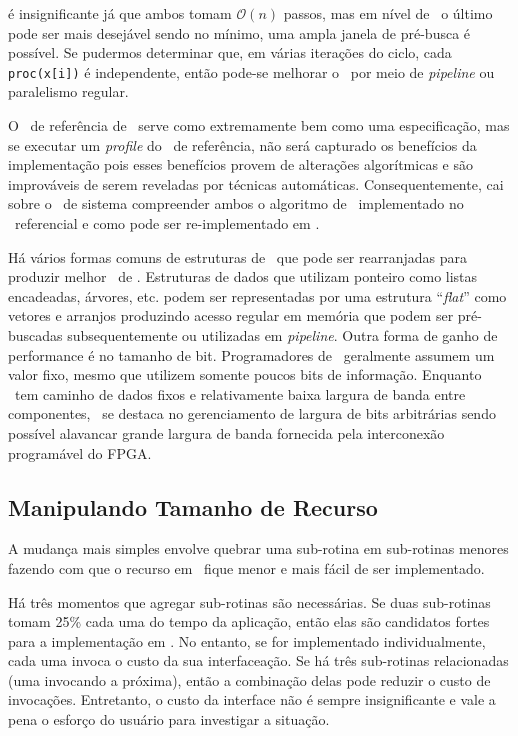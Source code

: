 		é insignificante já que ambos tomam $ \mathcal{O}(n) $ passos, mas em nível de \hardware\ o último pode ser mais desejável sendo no mínimo, uma ampla janela de pré-busca é possível. Se pudermos determinar que, em várias iterações do ciclo, cada \texttt{proc(x[i])} é independente, então pode-se melhorar o \design\ por meio de \textit{pipeline} ou paralelismo regular.

		O \design\ de referência de \software\ serve como extremamente bem como uma especificação, mas se executar um \textit{profile} do \design\ de referência, não será capturado os benefícios da implementação pois esses benefícios provem de alterações algorítmicas e são improváveis de serem reveladas por técnicas automáticas. Consequentemente, cai sobre o \designer\ de sistema compreender ambos o algoritmo de \software\ implementado no \design\ referencial e como pode ser re-implementado em \hardware.

		Há vários formas comuns de estruturas de \software\ que pode ser rearranjadas para produzir melhor \design\ de \hardware. Estruturas de dados que utilizam ponteiro como listas encadeadas, árvores, etc. podem ser representadas por uma estrutura ``\textit{flat}'' como vetores e arranjos produzindo acesso regular em memória que podem ser pré-buscadas subsequentemente ou utilizadas em \textit{pipeline}. Outra forma de ganho de performance é no tamanho de bit. Programadores de \software\ geralmente assumem um valor fixo, mesmo que utilizem somente poucos bits de informação. Enquanto \software\ tem caminho de dados fixos e relativamente baixa largura de banda entre componentes, \hardware\ se destaca no gerenciamento de largura de bits arbitrárias sendo possível alavancar grande largura de banda fornecida pela interconexão programável do FPGA.

	\subsection{Manipulando Tamanho de Recurso}

		A mudança mais simples envolve quebrar uma sub-rotina em sub-rotinas menores fazendo com que o recurso em \hardware\ fique menor e mais fácil de ser implementado.

		Há três momentos que agregar sub-rotinas são necessárias. Se duas sub-rotinas tomam 25\% cada uma do tempo da aplicação, então elas são candidatos fortes para a implementação em \hardware. No entanto, se for implementado individualmente, cada uma invoca o custo da sua interfaceação. Se há três sub-rotinas relacionadas (uma invocando a próxima), então a combinação delas pode reduzir o custo de invocações. Entretanto, o custo da interface não é sempre insignificante e vale a pena o esforço do usuário para investigar a situação.

